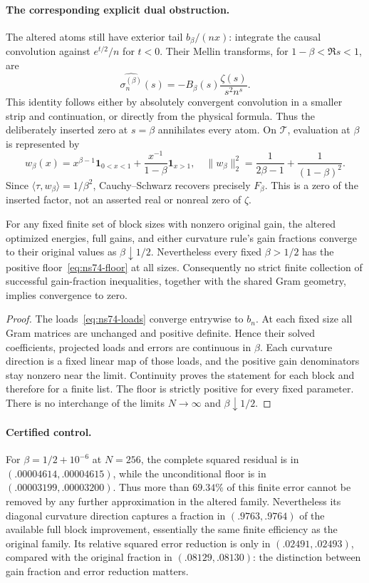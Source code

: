 \paragraph{The corresponding explicit dual obstruction.}
The altered atoms still have exterior tail $b_\beta/(nx)$: integrate the
causal convolution against $e^{t/2}/n$ for $t<0$.
Their Mellin transforms, for $1-\beta<\Re s<1$, are
\[
 \widehat{\sigma_n^{(\beta)}}(s)
     =-B_\beta(s)\frac{\zeta(s)}{s^2n^s}.
\]
This identity follows either by absolutely convergent convolution in a
smaller strip and continuation, or directly from the physical formula.
Thus the deliberately inserted zero at $s=\beta$ annihilates every atom.
On $\mathcal T$, evaluation at $\beta$ is represented by
\[
 w_\beta(x)=x^{\beta-1}\mathbf1_{0<x<1}
          +\frac{x^{-1}}{1-\beta}\mathbf1_{x>1},
 \quad
 \|w_\beta\|_2^2=\frac1{2\beta-1}+\frac1{(1-\beta)^2}.
\]
Since $\langle\tau,w_\beta\rangle=1/\beta^2$, Cauchy--Schwarz
recovers precisely $F_\beta$. This is a zero of the inserted factor,
not an asserted real or nonreal zero of $\zeta$.

\begin{corollary}
\label{cor:ns74-finite-indistinguishability}
For any fixed finite set of block sizes with nonzero original gain,
the altered optimized energies, full gains, and either curvature
rule's gain fractions converge to their original values as
$\beta\downarrow1/2$. Nevertheless every fixed $\beta>1/2$ has the
positive floor~\eqref{eq:ns74-floor} at all sizes. Consequently no
strict finite collection of successful gain-fraction inequalities,
together with the shared Gram geometry, implies convergence to zero.
\end{corollary}
\begin{proof}
The loads~\eqref{eq:ns74-loads} converge entrywise to $b_n$.
At each fixed size all Gram matrices are unchanged and positive
definite. Hence their solved coefficients, projected loads and errors
are continuous in $\beta$. Each curvature direction is a fixed linear
map of those loads, and the positive gain denominators stay nonzero
near the limit. Continuity proves the statement for each block and
therefore for a finite list. The floor is strictly positive for every
fixed parameter. There is no interchange of the limits $N\to\infty$
and $\beta\downarrow1/2$.
\end{proof}

\paragraph{Certified control.}
For $\beta=1/2+10^{-6}$ at $N=256$, the complete squared residual is
in $(.00004614,.00004615)$, while the unconditional floor is in
$(.00003199,.00003200)$. Thus more than $69.34\%$ of this finite error
cannot be removed by any further approximation in the altered family.
Nevertheless its diagonal curvature direction captures a fraction in
$(.9763,.9764)$ of the available full block improvement, essentially
the same finite efficiency as the original family. Its relative squared
error reduction is only in $(.02491,.02493)$, compared with the original
fraction in $(.08129,.08130)$: the distinction between gain fraction and
error reduction matters.

